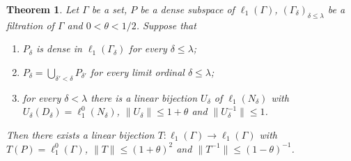 \documentclass[12pt]{article}
\newtheorem{theorem}{Theorem}[section]
\newcommand{\lo}[1]{\ell_1^0(#1)}
\newcommand{\ellone}[1]{\ell_1(#1)}
\newcommand{\norm}[1]{\lVert #1\rVert}
\begin{document}
\begin{theorem}\label{TransfiniteBackAndForth} Let $\Gamma$ be a set, $P$ be
    a dense subspace of $\ellone{\Gamma}$, ${(\Gamma_\delta)}_{\delta\leq\lambda}$
    be a filtration of $\Gamma$ and $0<\theta<1/2$. Suppose that
    \begin{enumerate}[label = (\roman*)]
        \item $P_\delta$ is dense in $\ellone{\Gamma_\delta}$ for every
              $\delta\leq\lambda$;
        \item $P_\delta=\bigcup_{\delta'<\delta}P_{\delta'}$ for every limit
              ordinal $\delta\leq\lambda$;
        \item for every $\delta<\lambda$ there is a linear bijection $U_\delta$
              of $\ellone{N_\delta}$ with $U_\delta(D_\delta)=\lo{N_\delta}$,
              $\norm{U_\delta}\leq 1+\theta$ and $\norm{U_\delta^{-1}}\leq 1$.
    \end{enumerate}
    Then there exists a linear bijection $T:\ellone{\Gamma}\to\ellone{\Gamma}$
    with $T(P)=\lo{\Gamma}$, $\norm{T}\leq{(1+\theta)}^2$ and
    $\norm{T^{-1}}\leq{(1-\theta)}^{-1}$.
\end{theorem}
\end{document}
